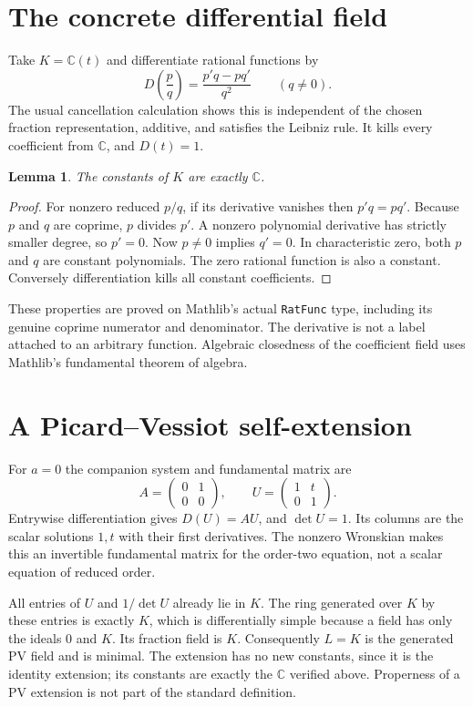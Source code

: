 \documentclass[10pt,a4paper]{article}
\newtheorem{lemma}{Lemma}
\begin{document}
\section{The concrete differential field}
Take $K=\mathbb C(t)$ and differentiate rational functions by
\[
D\!\left(\frac{p}{q}\right)=\frac{p'q-pq'}{q^2}\qquad(q\ne0).
\]
The usual cancellation calculation shows this is independent of the chosen
fraction representation, additive, and satisfies the Leibniz rule. It kills
every coefficient from $\mathbb C$, and $D(t)=1$.

\begin{lemma}
The constants of $K$ are exactly $\mathbb C$.
\end{lemma}
\begin{proof}
For nonzero reduced $p/q$, if its derivative vanishes then $p'q=pq'$.
Because $p$ and $q$ are coprime, $p$ divides $p'$. A nonzero polynomial
derivative has strictly smaller degree, so $p'=0$. Now $p\ne0$ implies
$q'=0$. In characteristic zero, both $p$ and $q$ are constant polynomials.
The zero rational function is also a constant. Conversely differentiation
kills all constant coefficients.
\end{proof}

These properties are proved on Mathlib's actual \texttt{RatFunc} type,
including its genuine coprime numerator and denominator. The derivative is
not a label attached to an arbitrary function. Algebraic closedness of the
coefficient field uses Mathlib's fundamental theorem of algebra.

\section{A Picard--Vessiot self-extension}
For $a=0$ the companion system and fundamental matrix are
\[
A=\begin{pmatrix}0&1\\0&0\end{pmatrix},\qquad
U=\begin{pmatrix}1&t\\0&1\end{pmatrix}.
\]
Entrywise differentiation gives $D(U)=AU$, and $\det U=1$. Its columns are
the scalar solutions $1,t$ with their first derivatives. The nonzero
Wronskian makes this an invertible fundamental matrix for the order-two
equation, not a scalar equation of reduced order.

All entries of $U$ and $1/\det U$ already lie in $K$. The ring generated
over $K$ by these entries is exactly $K$, which is differentially simple
because a field has only the ideals $0$ and $K$. Its fraction field is $K$.
Consequently $L=K$ is the generated PV field and is minimal. The extension
has no new constants, since it is the identity extension; its constants
are exactly the $\mathbb C$ verified above. Properness of a PV extension
is not part of the standard definition.
\end{document}
